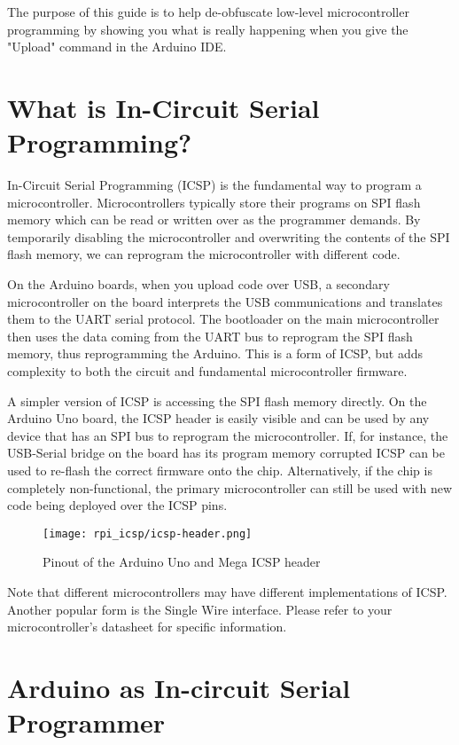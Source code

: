 The purpose of this guide is to help de-obfuscate low-level microcontroller programming by showing you what is really happening when you give the "Upload" command in the Arduino IDE.

\section*{What is In-Circuit Serial Programming?}

In-Circuit Serial Programming (ICSP) is the fundamental way to program a microcontroller. Microcontrollers typically
store their programs on SPI flash memory which can be read or written over as the programmer demands. By temporarily 
disabling the microcontroller and overwriting the contents of the SPI flash memory, we can reprogram the microcontroller
with different code.

On the Arduino boards, when you upload code over USB, a secondary microcontroller on the board interprets the USB
communications and translates them to the UART serial protocol. The bootloader on the main microcontroller then uses 
the data coming from the UART bus to reprogram the SPI flash memory, thus reprogramming the Arduino. This is a form of 
ICSP, but adds complexity to both the circuit and fundamental microcontroller firmware. 

A simpler version of ICSP is accessing the SPI flash memory directly. On the Arduino Uno board, the ICSP header is 
easily visible and can be used by any device that has an SPI bus to reprogram the microcontroller. 
If, for instance, the USB-Serial bridge on the board has its program memory corrupted ICSP can be used to re-flash the 
correct firmware onto the chip. Alternatively, if the chip is completely non-functional, the primary microcontroller 
can still be used with new code being deployed over the ICSP pins.

\begin{figure}
    \texttt{[image: rpi\_icsp/icsp-header.png]}
    \caption[Arduino ICSP Header]{Pinout of the Arduino Uno and Mega ICSP header}
\end{figure}

Note that different microcontrollers may have different implementations of ICSP. Another popular form is the Single
Wire interface. Please refer to your microcontroller's datasheet for specific information.

\section*{Arduino as In-circuit Serial Programmer}

